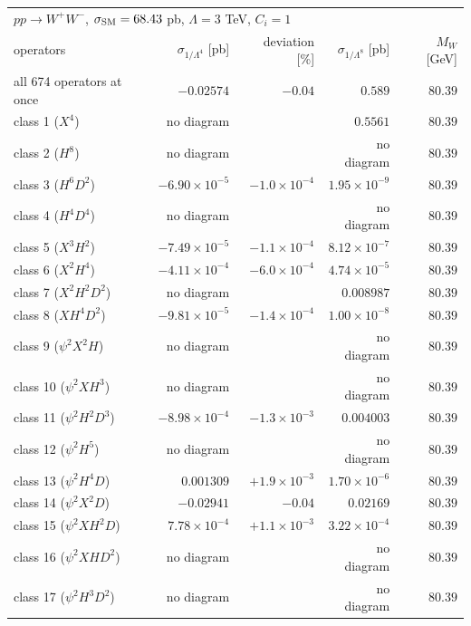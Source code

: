 \begin{table}[t]\centering\footnotesize\setlength{\tabcolsep}{4pt}
\begin{tabular}{@{}lrrrr@{}}\hline
\multicolumn{5}{l}{$p p \to W^+ W^-$, $\sigma_{\rm SM} = 68.43$ pb, $\Lambda = 3$ TeV, $C_i = 1$}\\
operators & $\sigma_{1/\Lambda^4}$ [pb] & deviation [\%] & $\sigma_{1/\Lambda^8}$ [pb] & $M_W$ [GeV]\\\hline
all 674 operators at once & $-0.02574$ & $-0.04$ & $0.589$ & $80.39$\\
class 1 ($X^4$) & no diagram &  & $0.5561$ & $80.39$\\
class 2 ($H^8$) & no diagram &  & no diagram & $80.39$\\
class 3 ($H^6 D^2$) & $-6.90\times 10^{-5}$ & $-1.0\times 10^{-4}$ & $1.95\times 10^{-9}$ & $80.39$\\
class 4 ($H^4 D^4$) & no diagram &  & no diagram & $80.39$\\
class 5 ($X^3 H^2$) & $-7.49\times 10^{-5}$ & $-1.1\times 10^{-4}$ & $8.12\times 10^{-7}$ & $80.39$\\
class 6 ($X^2 H^4$) & $-4.11\times 10^{-4}$ & $-6.0\times 10^{-4}$ & $4.74\times 10^{-5}$ & $80.39$\\
class 7 ($X^2 H^2 D^2$) & no diagram &  & $0.008987$ & $80.39$\\
class 8 ($X H^4 D^2$) & $-9.81\times 10^{-5}$ & $-1.4\times 10^{-4}$ & $1.00\times 10^{-8}$ & $80.39$\\
class 9 ($\psi^2 X^2 H$) & no diagram &  & no diagram & $80.39$\\
class 10 ($\psi^2 X H^3$) & no diagram &  & no diagram & $80.39$\\
class 11 ($\psi^2 H^2 D^3$) & $-8.98\times 10^{-4}$ & $-1.3\times 10^{-3}$ & $0.004003$ & $80.39$\\
class 12 ($\psi^2 H^5$) & no diagram &  & no diagram & $80.39$\\
class 13 ($\psi^2 H^4 D$) & $0.001309$ & $+1.9\times 10^{-3}$ & $1.70\times 10^{-6}$ & $80.39$\\
class 14 ($\psi^2 X^2 D$) & $-0.02941$ & $-0.04$ & $0.02169$ & $80.39$\\
class 15 ($\psi^2 X H^2 D$) & $7.78\times 10^{-4}$ & $+1.1\times 10^{-3}$ & $3.22\times 10^{-4}$ & $80.39$\\
class 16 ($\psi^2 X H D^2$) & no diagram &  & no diagram & $80.39$\\
class 17 ($\psi^2 H^3 D^2$) & no diagram &  & no diagram & $80.39$\\

\end{tabular}
\end{table}
